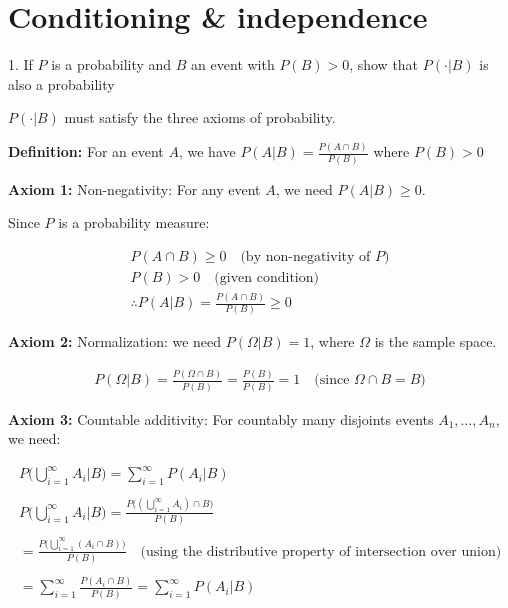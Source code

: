 \documentclass[10pt]{article}
\begin{document}
\newpage

\section{Conditioning \& independence}

1. If $P$ is a probability and $B$ an event with $P(B) > 0$, show that $P(\cdot|B)$ is also a probability

$P(\cdot|B)$ must satisfy the three axioms of probability.

\hfill  

\textbf{Definition: }For an event $A$, we have $P(A|B) = \frac{P(A\cap B)}{P(B)}$ where $P(B) > 0$

\textbf{Axiom 1: }Non-negativity: For any event $A$, we need $P(A|B) \geq 0$.

Since $P$ is a probability measure:

\begin{gather*}
    P(A \cap B) \geq 0 \quad\text{(by non-negativity of $P$)}\\
    P(B) > 0\quad\text{(given condition)} \\
    \therefore P(A|B) = \frac{P(A\cap B)}{P(B)} \geq 0
\end{gather*}

\textbf{Axiom 2: }Normalization: we need $P(\Omega | B) = 1$, where $\Omega$ is the sample space.

\begin{gather*}
    P(\Omega|B) = \frac{P(\Omega\cap B)}{P(B)} = \frac{P(B)}{P(B)} = 1 \quad\text{(since $\Omega \cap B = B$)}
\end{gather*}

\textbf{Axiom 3: }Countable additivity: For countably many disjoints events $A_1, …, A_n$, we need:

\begin{gather*}
    P\Bigg(\bigcup_{i = 1}^\infty A_i \bigg|B \Bigg) = \sum_{i = 1}^{\infty}P(A_i | B) \\
    \\
    P\Bigg(\bigcup_{i = 1}^\infty A_i \bigg|B \Bigg) = \frac{P\big((\bigcup_{i = 1}^\infty A_i) \cap B\big)}{P(B)}\\
    \\
    = \frac{P\big(\bigcup_{i = 1}^\infty(A_i \cap B)\big)}{P(B)} \quad\text{(using the distributive property of intersection over union)} \\
    \\ = \sum_{i = 1}^{\infty} \frac{P(A_i \cap B)}{P(B)} = \sum_{i = 1}^{\infty}P(A_i | B)
\end{gather*}
\end{document}
